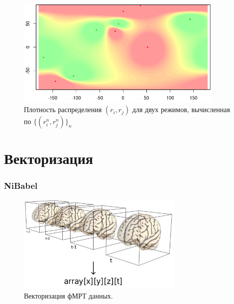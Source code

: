 \documentclass{beamer}
\begin{document}
	\begin{frame} 
		\begin{figure}
			\includegraphics[width=10cm]{../images/classification.png}
			\caption{Плотность распределения $(r_i, r_j)$ для двух режимов, вычисленная по $\{(r_i^n, r_j^n)\}_n$} 
			\label{fg:4}
		\end{figure}
	\end{frame}

	\section{Векторизация}
	\begin{frame} 
		\frametitle{NiBabel}
		\begin{figure}

			\includegraphics[width=8cm]{../images/vectorization_2.pdf}
			\caption{Векторизация фМРТ данных.} 
			\label{fg:4}
		\end{figure}
	\end{frame}
		
		
\end{document}
